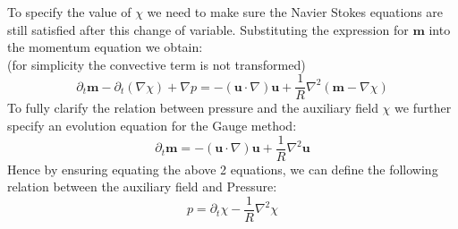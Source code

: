 To specify the value of $\chi$ we need to make sure the Navier Stokes equations are still satisfied after this change of variable. Substituting the expression for $\textbf{m}$ into the momentum equation we obtain:\\
(for simplicity the convective term is not transformed)
\begin{equation}
\partial_t\textbf{m} - \partial_t(\nabla \chi) + \nabla p = -(\textbf{u} \cdot \nabla)\textbf{u} + \dfrac{1}{R}\nabla^2\left(\textbf{m} - \nabla \chi \right)
\end{equation}
To fully clarify the relation between pressure and the auxiliary field $\chi$ we further specify an evolution equation for the Gauge method:
\begin{equation}\label{eq:Gauge momentum equation}
\partial_t \textbf{m} = -(\textbf{u} \cdot \nabla)\textbf{u}  + \dfrac{1}{R}\nabla^2\textbf{u}
\end{equation}
Hence by ensuring equating the above 2 equations, we can define the following relation between the auxiliary field and Pressure:
\begin{equation}
p = \partial_t\chi - \dfrac{1}{R}\nabla^2\chi
\end{equation}

